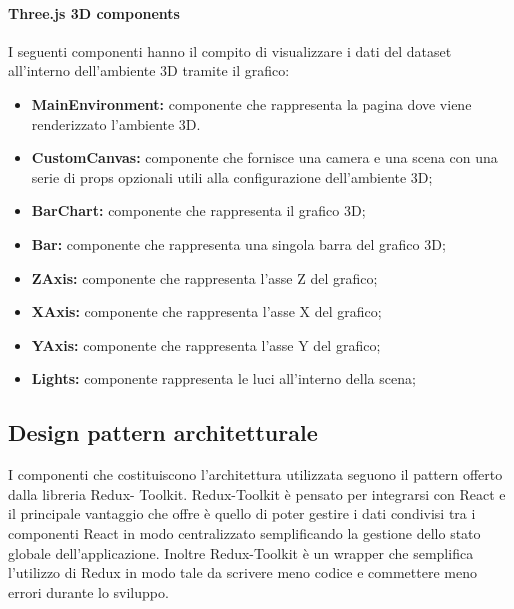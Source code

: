     \paragraph{Three.js 3D components}
        I seguenti componenti hanno il compito di visualizzare i dati del dataset all'interno dell'ambiente 3D tramite il grafico:
        \begin{itemize}
            \item \textbf{MainEnvironment:} componente che rappresenta la pagina dove viene renderizzato l'ambiente 3D.
            \item \textbf{CustomCanvas:} componente che fornisce una camera e una scena con una serie di props opzionali utili alla configurazione dell’ambiente 3D;
            \item \textbf{BarChart:} componente che rappresenta il grafico 3D;
            \item \textbf{Bar:} componente che rappresenta una singola barra del grafico 3D;
            \item \textbf{ZAxis:} componente che rappresenta l'asse Z del grafico;
            \item \textbf{XAxis:} componente che rappresenta l'asse X del grafico;
            \item \textbf{YAxis:} componente che rappresenta l'asse Y del grafico;
            \item \textbf{Lights:} componente rappresenta le luci all’interno della scena;
        \end{itemize}

\subsection{Design pattern architetturale}
I componenti che costituiscono l’architettura utilizzata seguono il pattern offerto dalla libreria Redux-
Toolkit.
Redux-Toolkit è pensato per integrarsi con React e il principale vantaggio che offre è quello di poter
gestire i dati condivisi tra i componenti React in modo centralizzato semplificando la gestione dello stato
globale dell’applicazione.
Inoltre Redux-Toolkit è un wrapper che semplifica l'utilizzo di Redux in modo tale da scrivere meno codice e commettere meno errori durante lo sviluppo.


